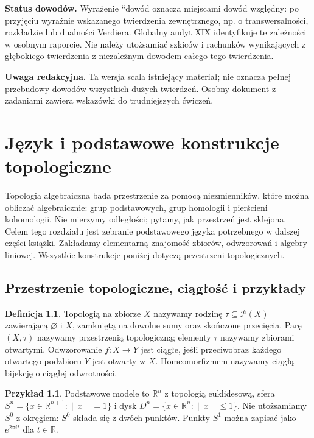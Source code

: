 \documentclass[11pt,a4paper,oneside]{report}
\newcommand{\R}{\mathbb{R}}
\theoremstyle{plain}
\theoremstyle{definition}
\newtheorem{definicja}[twierdzenie]{Definicja}
\newtheorem{przyklad}[twierdzenie]{Przykład}
\theoremstyle{remark}
\begin{document}
\noindent\textbf{Status dowodów.} Wyrażenie ``dowód oznacza miejscami
dowód względny: po przyjęciu wyraźnie wskazanego twierdzenia
zewnętrznego, np. o transwersalności, rozkładzie lub dualności Verdiera.
Globalny audyt XIX identyfikuje te zależności w osobnym raporcie.
Nie należy utożsamiać szkiców i rachunków wynikających z głębokiego
twierdzenia z niezależnym dowodem całego tego twierdzenia.

\noindent\textbf{Uwaga redakcyjna.} Ta wersja scala istniejący materiał;
nie oznacza pełnej przebudowy dowodów wszystkich dużych twierdzeń.
Osobny dokument z zadaniami zawiera wskazówki do trudniejszych ćwiczeń.
\clearpage
\chapter{Język i podstawowe konstrukcje topologiczne}
\label{ch:wstep-topologia}

Topologia algebraiczna bada przestrzenie za pomocą niezmienników, które można
obliczać algebraicznie: grup podstawowych, grup homologii i pierścieni
kohomologii. Nie mierzymy odległości; pytamy, jak przestrzeń jest sklejona.
Celem tego rozdziału jest zebranie podstawowego języka potrzebnego w dalszej
części książki. Zakładamy elementarną znajomość zbiorów, odwzorowań i algebry
liniowej. Wszystkie konstrukcje poniżej dotyczą przestrzeni topologicznych.

\section{Przestrzenie topologiczne, ciągłość i przykłady}

\begin{definicja}
Topologią na zbiorze $X$ nazywamy rodzinę $\tau\subseteq\mathcal P(X)$
zawierającą $\varnothing$ i $X$, zamkniętą na dowolne sumy oraz skończone
przecięcia. Parę $(X,\tau)$ nazywamy przestrzenią topologiczną; elementy
$\tau$ nazywamy zbiorami otwartymi. Odwzorowanie $f:X\to Y$ jest ciągłe,
jeśli przeciwobraz każdego otwartego podzbioru $Y$ jest otwarty w $X$.
Homeomorfizmem nazywamy ciągłą bijekcję o ciągłej odwrotności.
\end{definicja}

\begin{przyklad}
Podstawowe modele to $\R^n$ z topologią euklidesową, sfera
$S^n=\{x\in\R^{n+1}:\|x\|=1\}$ i dysk $D^n=\{x\in\R^n:\|x\|\leq1\}$.
Nie utożsamiamy $S^0$ z okręgiem: $S^0$ składa się z dwóch punktów.
Punkty $S^1$ można zapisać jako $e^{2\pi it}$ dla $t\in\R$.
\end{przyklad}
\end{document}
